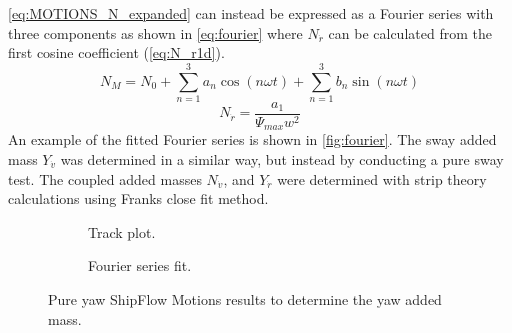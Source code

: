 \autoref{eq:MOTIONS_N_expanded} can instead be expressed as a Fourier series with three components as shown in \autoref{eq:fourier} where $N_{\dot{r}}$ can be calculated from the first cosine coefficient (\autoref{eq:N_r1d}).
\begin{equation}
    N_M = N_0 + \sum_{n=1}^3a_n \cos(n \omega t) + \sum_{n=1}^3b_n \sin(n \omega t) 
    \label{eq:fourier}
\end{equation}
\begin{equation}
    N_{\dot{r}} = \frac{a_1}{\Psi_{max} w^{2}}
    \label{eq:N_r1d}
\end{equation}
An example of the fitted Fourier series is shown in \autoref{fig:fourier}. The sway added mass $Y_{\dot{v}}$ was determined in a similar way, but instead by conducting a pure sway test. The coupled added masses $N_{\dot{v}}$, and $Y_{\dot{r}}$ were determined with strip theory calculations using Franks close fit method.
\begin{figure}[h]
    \centering
    \begin{subfigure}[b]{0.49\textwidth}
        
        \caption{Track plot.}
    \end{subfigure}
    \hfill
    \begin{subfigure}[b]{0.49\textwidth}
        
        \caption{Fourier series fit.}
    \end{subfigure}
    \caption{Pure yaw ShipFlow Motions results to determine the yaw added mass.}
    \label{fig:fourier}
\end{figure}